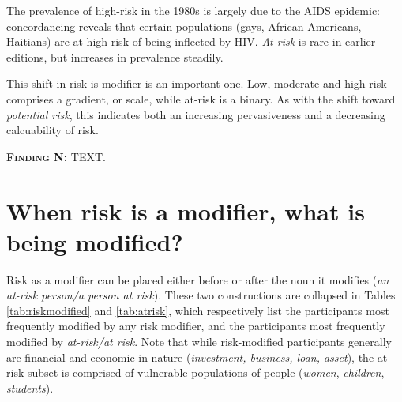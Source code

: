 			The prevalence of high-risk in the 1980s is largely due to the AIDS epidemic: concordancing reveals that certain populations (gays, African Americans, Haitians) are at high-risk of being inflected by HIV. \emph{At-risk} is rare in earlier editions, but increases in prevalence steadily.

			This shift in risk is modifier is an important one. Low, moderate and high risk comprises a gradient, or scale, while at-risk is a binary. As with the shift toward \emph{potential risk}, this indicates both an increasing pervasiveness and a decreasing calcuability of risk. %
			




  \noindent\colorbox{yellow!20}{%
  \parbox{1\textwidth}{%
  \textsc{\textbf{Finding N:}} TEXT.}}

			\section{When risk is a modifier, what is being modified?}
			\FloatBarrier

			Risk as a modifier can be placed either before or after the noun it modifies (\emph{an at-risk person\slash a person at risk}). These two constructions are collapsed in Tables \ref{tab:riskmodified} and \ref{tab:atrisk}, which respectively list the participants most frequently modified by any risk modifier, and the participants most frequently modified by \emph{at-risk\slash at risk}. Note that while risk-modified participants generally are financial and economic in nature (\emph{investment, business, loan, asset}), the at-risk subset is comprised of vulnerable populations of people (\emph{women}, \emph{children}, \emph{students}).

